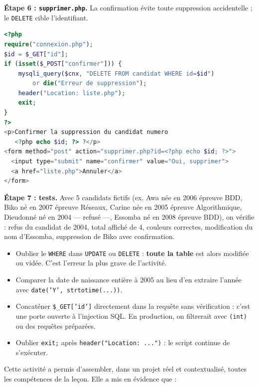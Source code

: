 \documentclass[11pt]{article}
\newcommand{\cle}[1]{{\popxbold\color{popdark}#1}}
\newcounter{popsec}
\newcounter{popsub}
\newcommand{\courssub}[1]{%
  \stepcounter{popsub}%
  \par\vspace{9pt}\noindent{\popxbold\fontsize{11.5}{13}\selectfont\color{popink}{\color{poporange}\thepopsec.\thepopsub}\hspace{6pt}#1}\par\nopagebreak\vspace{4pt}
}
\begin{document}
\begin{exoresolu}
\textbf{Étape 6 : \texttt{supprimer.php}.} La confirmation évite toute suppression accidentelle ; le \texttt{DELETE} cible l'identifiant.
\begin{lstlisting}[language=Php]
<?php
require("connexion.php");
$id = $_GET["id"];
if (isset($_POST["confirmer"])) {
    mysqli_query($cnx, "DELETE FROM candidat WHERE id=$id")
        or die("Erreur de suppression");
    header("Location: liste.php");
    exit;
}
?>
<p>Confirmer la suppression du candidat numero
   <?php echo $id; ?> ?</p>
<form method="post" action="supprimer.php?id=<?php echo $id; ?>">
  <input type="submit" name="confirmer" value="Oui, supprimer">
  <a href="liste.php">Annuler</a>
</form>
\end{lstlisting}

\textbf{Étape 7 : tests.} Avec 5 candidats fictifs (ex. Awa née en 2006 épreuve BDD, Biko né en 2007 épreuve Réseaux, Carine née en 2005 épreuve Algorithmique, Dieudonné né en 2004 — refusé —, Essomba né en 2008 épreuve BDD), on vérifie : refus du candidat de 2004, total affiché de 4, couleurs correctes, modification du nom d'Essomba, suppression de Biko avec confirmation.
\end{exoresolu}

\begin{attention}
\begin{itemize}
\item Oublier le \texttt{WHERE} dans \texttt{UPDATE} ou \texttt{DELETE} : \textbf{toute la table} est alors modifiée ou vidée. C'est l'erreur la plus grave de l'activité.
\item Comparer la date de naissance entière à 2005 au lieu d'en extraire l'année avec \texttt{date('Y', strtotime(...))}.
\item Concaténer \texttt{\$\_GET['id']} directement dans la requête sans vérification : c'est une porte ouverte à l'\cle{injection SQL}. En production, on filtrerait avec \texttt{(int)} ou des requêtes préparées.
\item Oublier \texttt{exit;} après \texttt{header("Location: ...")} : le script continue de s'exécuter.
\end{itemize}
\end{attention}

\courssub{Bilan de l'activité}

Cette activité a permis d'assembler, dans un projet réel et contextualisé, toutes les compétences de la leçon. Elle a mis en évidence que :
\end{document}
